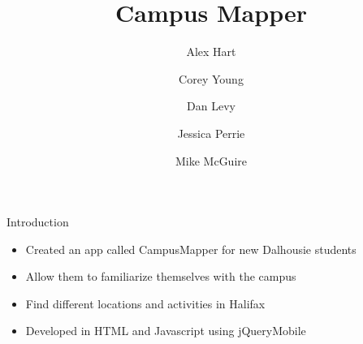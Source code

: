 \documentclass{beamer}
\title{Campus Mapper}
\author[Hart, Young, Levy, Perrie, McGuire]{
    Alex Hart \and Corey Young \and Dan Levy \\
    \and Jessica Perrie \and Mike McGuire
}
\begin{document}
\begin{frame}
    \maketitle
\end{frame}

\begin{frame}{Introduction}
\begin{itemize}
    \item Created an app called CampusMapper for new Dalhousie students 
    \item Allow them to familiarize themselves with the campus
    \item Find different locations and activities in Halifax
    \item Developed in HTML and Javascript using jQueryMobile 
\end{itemize}
\end{frame}
\end{document}
